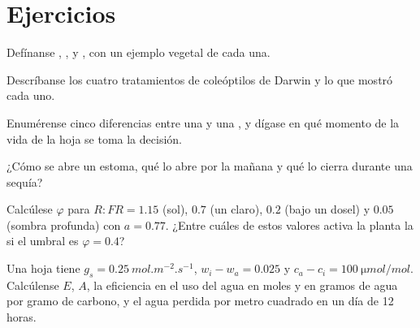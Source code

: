 \section{Ejercicios}

\begin{exercise}[$\star$]\label{exo:b2:plant-plasticity:1}
Defínanse , ,  y
, con un ejemplo vegetal de cada una.
\end{exercise}

\begin{exercise}[$\star$]\label{exo:b2:plant-plasticity:2}
Descríbanse los cuatro tratamientos de coleóptilos de Darwin y lo que
mostró cada uno.
\end{exercise}

\begin{exercise}[$\star$]\label{exo:b2:plant-plasticity:3}
Enumérense cinco diferencias entre una  y una ,
y dígase en qué momento de la vida de la hoja se toma la decisión.
\end{exercise}

\begin{exercise}[$\star$]\label{exo:b2:plant-plasticity:4}
¿Cómo se abre un estoma, qué lo abre por la mañana y qué lo cierra durante
una sequía?
\end{exercise}

\begin{exercise}[$\star\star$]\label{exo:b2:plant-plasticity:5}
Calcúlese $\varphi$ para $R{:}FR = 1.15$ (sol), $0.7$ (un claro), $0.2$
(bajo un dosel) y $0.05$ (sombra profunda) con $a = 0.77$. ¿Entre cuáles
de estos valores activa la planta la  si el umbral
es $\varphi = 0.4$?
\end{exercise}

\begin{exercise}[$\star\star$]\label{exo:b2:plant-plasticity:6}
Una hoja tiene $g_s = \qty{0.25}{mol.m^{-2}.s^{-1}}$, $w_i - w_a = 0.025$ y
$c_a - c_i = \qty{100}{\micro mol/mol}$. Calcúlense $E$, $A$, la eficiencia
en el uso del agua en moles y en gramos de agua por gramo de carbono, y el
agua perdida por metro cuadrado en un día de 12 horas.
\end{exercise}

